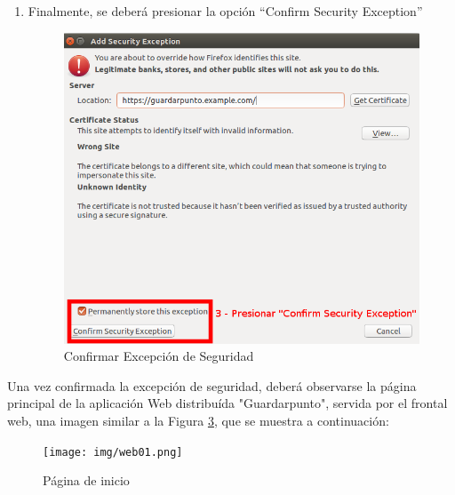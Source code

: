 \documentclass[12pt,spanish]{article}
\begin{document}
\begin{itemize}
\begin{enumerate}
\begin{center}
\begin{figure}[H]
\begin{center}
   \label{fig:connectionNotSecure00}
 \end{center}
 \end{figure}
\end{center}
\item{Finalmente, se deberá presionar la opción ``Confirm Security Exception''}
\begin{center}
 \begin{figure}[H]
 \begin{center}
   \includegraphics[width=14cm]{img/confirmSecurityException03.png}
   \caption{Confirmar Excepción de Seguridad}
   \label{fig:confirmSecurityException00}
 \end{center}
 \end{figure}
\end{center}
\end{enumerate}

Una vez confirmada la excepción de seguridad, deberá observarse la página principal de la aplicación Web distribuída "Guardarpunto", servida por el frontal web, una imagen similar a la Figura \ref{fig:initPage00}, que se muestra a continuación:
\begin{center}
 \begin{figure}[H]
 \begin{center}
   \texttt{[image: img/web01.png]}
   \caption{Página de inicio}
   \label{fig:initPage00}
 \end{center}
 \end{figure}
\end{center}

\end{itemize}
\end{document}
